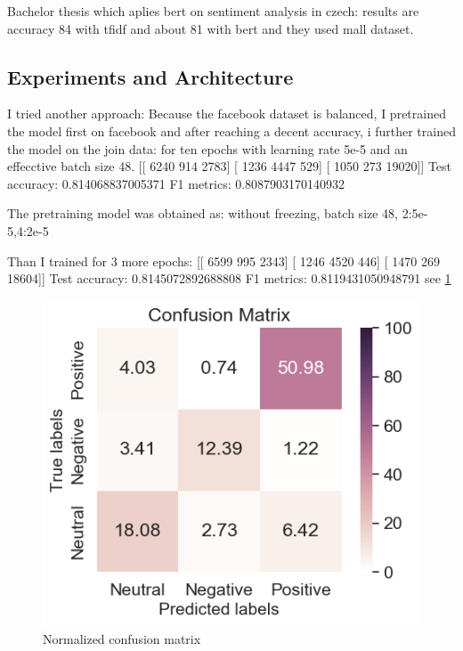 Bachelor thesis which aplies bert on sentiment analysis in czech:
results are accuracy 84 with tfidf and about 81 with bert and they used mall dataset.




\subsection{Experiments and Architecture}
I tried another approach:
Because the facebook dataset is balanced, I pretrained the model first on facebook and after reaching a decent accuracy, i further trained the model on the join data:
for ten epochs with learning rate 5e-5 and an effecctive batch size 48.
[[ 6240 914 2783]
[ 1236 4447 529]
[ 1050 273 19020]]
Test accuracy: 0.814068837005371
F1 metrics: 0.8087903170140932

The pretraining model was obtained as:
without freezing, batch size 48, 2:5e-5,4:2e-5



Than I trained for 3 more epochs:
[[ 6599 995 2343]
[ 1246 4520 446]
[ 1470 269 18604]]
Test accuracy: 0.8145072892688808
F1 metrics: 0.8119431050948791
see \ref{pic:conf1}
\begin{figure}[h]
\centering
\includegraphics[width=1\columnwidth]{../img/confusion_matrix}
\protect\caption{Normalized confusion matrix}
\label{pic:conf1}
\end{figure}

